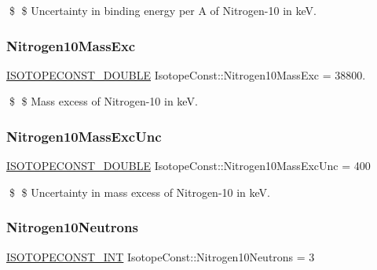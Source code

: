 \$ \$ Uncertainty in binding energy per A of Nitrogen-\/10 in keV. \mbox{\label{group___isotope_const-_nitrogen-_n10_ga37858a327ddc33b323dabadbec672804}} 
\subsubsection{\texorpdfstring{Nitrogen10\+Mass\+Exc}{Nitrogen10MassExc}}
{\footnotesize\ttfamily \mbox{\hyperlink{group___isotope_const-_macros_ga8f45a7272ce02c0b4c65c44636ed719a}{I\+S\+O\+T\+O\+P\+E\+C\+O\+N\+S\+T\+\_\+\+D\+O\+U\+B\+LE}} Isotope\+Const\+::\+Nitrogen10\+Mass\+Exc = 38800.}

\$ \$ Mass excess of Nitrogen-\/10 in keV. \mbox{\label{group___isotope_const-_nitrogen-_n10_ga46e2b51447aa5140189a9566fc13c992}} 
\subsubsection{\texorpdfstring{Nitrogen10\+Mass\+Exc\+Unc}{Nitrogen10MassExcUnc}}
{\footnotesize\ttfamily \mbox{\hyperlink{group___isotope_const-_macros_ga8f45a7272ce02c0b4c65c44636ed719a}{I\+S\+O\+T\+O\+P\+E\+C\+O\+N\+S\+T\+\_\+\+D\+O\+U\+B\+LE}} Isotope\+Const\+::\+Nitrogen10\+Mass\+Exc\+Unc = 400}

\$ \$ Uncertainty in mass excess of Nitrogen-\/10 in keV. \mbox{\label{group___isotope_const-_nitrogen-_n10_ga641e219ef116bca2ff33b00964110efe}} 
\subsubsection{\texorpdfstring{Nitrogen10\+Neutrons}{Nitrogen10Neutrons}}
{\footnotesize\ttfamily \mbox{\hyperlink{group___isotope_const-_macros_ga5f18360b3e99483a35c32d789e62621c}{I\+S\+O\+T\+O\+P\+E\+C\+O\+N\+S\+T\+\_\+\+I\+NT}} Isotope\+Const\+::\+Nitrogen10\+Neutrons = 3}

